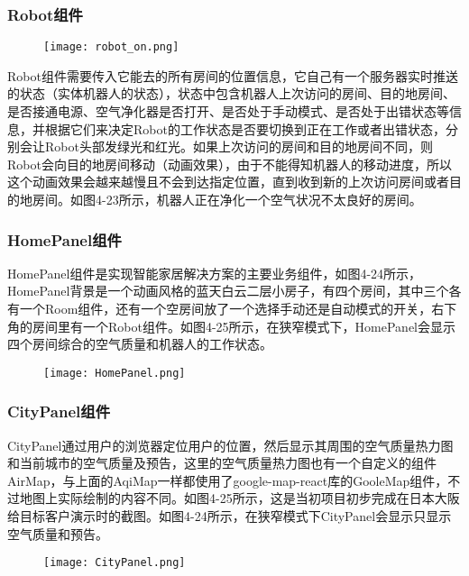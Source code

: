 \subsubsection{Robot组件}
\begin{figure}[!htp]
 \centering
 \texttt{[image: robot\_on.png]}
\end{figure}
Robot组件需要传入它能去的所有房间的位置信息，它自己有一个服务器实时推送的状态（实体机器人的状态），状态中包含机器人上次访问的房间、目的地房间、是否接通电源、空气净化器是否打开、是否处于手动模式、是否处于出错状态等信息，并根据它们来决定Robot的工作状态是否要切换到正在工作或者出错状态，分别会让Robot头部发绿光和红光。如果上次访问的房间和目的地房间不同，则Robot会向目的地房间移动（动画效果），由于不能得知机器人的移动进度，所以这个动画效果会越来越慢且不会到达指定位置，直到收到新的上次访问房间或者目的地房间。如图4-23所示，机器人正在净化一个空气状况不太良好的房间。
\subsubsection{HomePanel组件}
HomePanel组件是实现智能家居解决方案的主要业务组件，如图4-24所示，HomePanel背景是一个动画风格的蓝天白云二层小房子，有四个房间，其中三个各有一个Room组件，还有一个空房间放了一个选择手动还是自动模式的开关，右下角的房间里有一个Robot组件。如图4-25所示，在狭窄模式下，HomePanel会显示四个房间综合的空气质量和机器人的工作状态。
\begin{figure}[!htp]
 \centering
 \texttt{[image: HomePanel.png]}
\end{figure}
\subsubsection{CityPanel组件}
CityPanel通过用户的浏览器定位用户的位置，然后显示其周围的空气质量热力图和当前城市的空气质量及预告，这里的空气质量热力图也有一个自定义的组件AirMap，与上面的AqiMap一样都使用了google-map-react库的GooleMap组件，不过地图上实际绘制的内容不同。如图4-25所示，这是当初项目初步完成在日本大阪给目标客户演示时的截图。如图4-24所示，在狭窄模式下CityPanel会显示只显示空气质量和预告。
\begin{figure}[!htp]
 \centering
 \texttt{[image: CityPanel.png]}
\end{figure}
